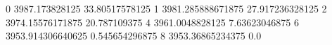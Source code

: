 0 3987.173828125 33.80517578125
1 3981.285888671875 27.917236328125
2 3974.15576171875 20.787109375
4 3961.0048828125 7.63623046875
6 3953.914306640625 0.545654296875
8 3953.36865234375 0.0

